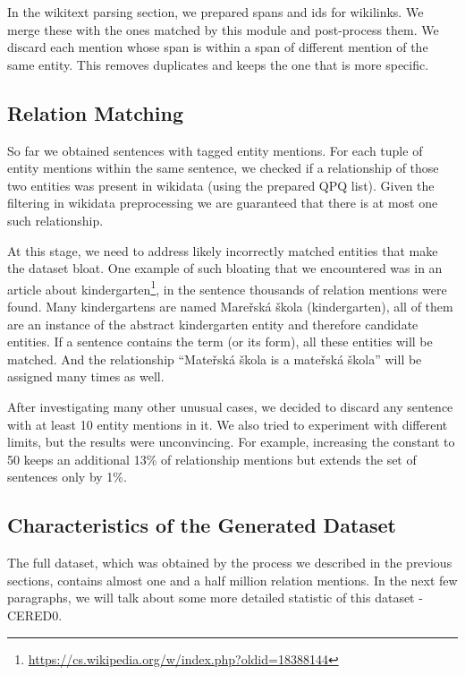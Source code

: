 In the wikitext parsing section, we prepared spans and ids for wikilinks. We merge these with the ones matched by this module and post-process them. We discard each mention whose span is within a span of different mention of the same entity. This removes duplicates and keeps the one that is more specific.


\subsection{Relation Matching}
So far we obtained sentences with tagged entity mentions. For each tuple of entity mentions within the same sentence, we checked if a relationship of those two entities was present in wikidata (using the prepared QPQ list). Given the filtering in wikidata preprocessing we are guaranteed that there is at most one such relationship. 

At this stage, we need to address likely incorrectly matched entities that make the dataset bloat. One example of such bloating that we encountered was in an article about kindergarten\footnote{\url{https://cs.wikipedia.org/w/index.php?oldid=18388144}}, in the sentence  thousands of relation mentions were found. Many kindergartens are named Mareřská škola (kindergarten), all of them are an instance of the abstract kindergarten entity and therefore candidate entities. If a sentence contains the term  (or its form), all these entities will be matched. And the relationship “Mateřská škola is a mateřská škola”  will be assigned many times as well. 

After investigating many other unusual cases, we decided to discard any sentence with at least 10 entity mentions in it. We also tried to experiment with different limits, but the results were unconvincing. For example, increasing the constant to 50 keeps an additional 13\% of relationship mentions but extends the set of sentences only by 1\%.


\subsection{Characteristics of the Generated Dataset}
The full dataset, which was obtained by the process we described in the previous sections, contains almost one and a half million relation mentions. In the next few paragraphs, we will talk about some more detailed statistic of this dataset - CERED0. 

